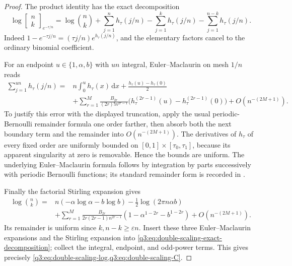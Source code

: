 \documentclass[11pt,a4paper,oneside,openany]{book}
\theoremstyle{definition}
\theoremstyle{remark}
\newcommand{\GB}[3][q]{\begin{bmatrix}#2\\#3\end{bmatrix}_{#1}}
\newcommand{\dd}{\,\mathrm d}
\newcommand{\Gb}[3]{\GB[#3]{#1}{#2}}
\begin{document}
\begin{proof}
The product identity has the exact decomposition
\begin{equation}
 \log\Gb nk{e^{-\tau/n}}
  =\log\binom nk+
      \sum_{j=1}^n h_\tau(j/n)
      -\sum_{j=1}^k h_\tau(j/n)
      -\sum_{j=1}^{n-k}h_\tau(j/n).
 \label{q3:eq:double-scaling-exact-decomposition}
\end{equation}
Indeed $1-e^{-\tau j/n}=(\tau j/n)e^{h_\tau(j/n)}$, and the elementary
factors cancel to the ordinary binomial coefficient.

For an endpoint $u\in\{1,\alpha,b\}$ with $un$ integral,
Euler--Maclaurin on mesh $1/n$ reads
\begin{align*}
 \sum_{j=1}^{un}h_\tau(j/n)
 ={}&n\int_0^u h_\tau(x)\dd x+\frac{h_\tau(u)-h_\tau(0)}2\\
 &+\sum_{r=1}^M\frac{B_{2r}}{(2r)!n^{2r-1}}
       \bigl(h_\tau^{(2r-1)}(u)-h_\tau^{(2r-1)}(0)\bigr)
       +O(n^{-(2M+1)}).
\end{align*}
To justify this error with the displayed truncation, apply the usual
periodic-Bernoulli remainder formula one order farther, then absorb
both the next boundary term and the remainder into $O(n^{-(2M+1)})$.
The derivatives of $h_\tau$ of every fixed order are uniformly bounded
on $[0,1]\times[\tau_0,\tau_1]$, because its apparent singularity at
zero is removable. Hence the bounds are uniform. The underlying
Euler--Maclaurin formula follows by integration by parts successively
with periodic Bernoulli functions; its standard remainder form is
recorded in \cite[\S2.10(i)]{dlmfem}.

Finally the factorial Stirling expansion
\cite[\S5.11]{dlmfgamma} gives
\begin{align*}
 \log\binom nk={}&n(-\alpha\log\alpha-b\log b)
                  -\frac12\log(2\pi n\alpha b)\\
 &+\sum_{r=1}^M\frac{B_{2r}}{2r(2r-1)n^{2r-1}}
       (1-\alpha^{1-2r}-b^{1-2r})+O(n^{-(2M+1)}).
\end{align*}
Its remainder is uniform since $k,n-k\ge\varepsilon n$.
Insert these three Euler--Maclaurin expansions and the Stirling
expansion into \cref{q3:eq:double-scaling-exact-decomposition}; collect
the integral, endpoint, and odd-power terms. This gives precisely
\cref{q3:eq:double-scaling-log,q3:eq:double-scaling-C}.
\end{proof}
\end{document}

